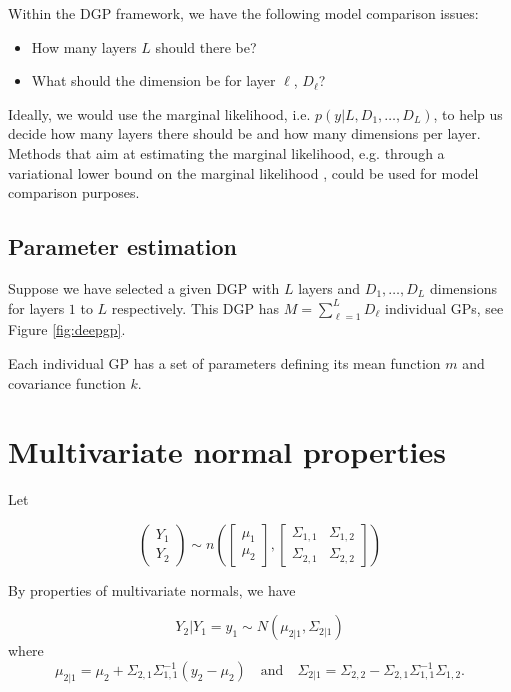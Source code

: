 \documentclass{article}
\newcommand{\1}{\mathbbm{1}}
\begin{document}
Within the DGP framework,
we have the following model comparison issues:

\begin{itemize}
\item How many layers $L$ should there be?
\item What should the dimension be for layer $\ell$, $D_\ell$?
\end{itemize}
Ideally, we would use the marginal likelihood,
i.e. $p(y|L,D_1,\ldots,D_L)$, to help us decide how many layers there should be
and how many dimensions per layer.
Methods that aim at estimating the marginal likelihood,
e.g. through a variational lower bound on the marginal likelihood \citep{damianou2013deep},
could be used for model comparison purposes.

\subsection{Parameter estimation}

Suppose we have selected a given DGP with $L$ layers and $D_1,\ldots,D_L$
dimensions for layers $1$ to $L$ respectively.
This DGP has $M=\sum_{\ell=1}^L D_\ell$ individual GPs,
see Figure \ref{fig:deepgp}.

Each individual GP has a set of parameters defining its mean function $m$ and
covariance function $k$.


\appendix
\section{Multivariate normal properties}
\label{app:normal}

Let

\[
\left( \begin{array}{c} Y_1 \\ Y_2 \end{array} \right) \sim
n\left(\left[\begin{array}{c} \mu_1 \\ \mu_2 \end{array} \right] ,
\left[\begin{array}{cc} \Sigma_{1,1} & \Sigma_{1,2} \\
\Sigma_{2,1} & \Sigma_{2,2} \end{array} \right]\right)
\]

By properties of multivariate normals, we have

\[
Y_2|Y_1=y_1 \sim N\left(\mu_{2|1}, \Sigma_{2|1}\right)
\]
where
\[
\mu_{2|1} = \mu_2 + \Sigma_{2,1}\Sigma_{1,1}^{-1}(y_2-\mu_2)
\quad \mbox{and} \quad
\Sigma_{2|1} = \Sigma_{2,2} - \Sigma_{2,1}\Sigma_{1,1}^{-1}\Sigma_{1,2}.
\]
\end{document}
